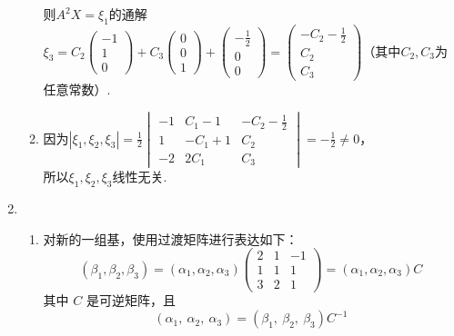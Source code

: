 \begin{enumerate}
\begin{enumerate}
                则$A^2X=\xi_1$的通解\\
                $\xi_3=C_2\begin{pmatrix}
                    -1 \\
                    1 \\
                    0
                \end{pmatrix}+C_3\begin{pmatrix}
                    0 \\
                    0 \\
                    1
                \end{pmatrix}+\begin{pmatrix}
                    -\frac 12 \\
                    0 \\
                    0
                \end{pmatrix}=\begin{pmatrix}
                    -C_2 - \frac 12 \\
                    C_2 \\
                    C_3
                \end{pmatrix}$（其中$C_2, C_3$为任意常数）.
            \item
                因为$|\xi_1,\xi_2,\xi_3|=\frac 12\begin{vmatrix}
                    -1 & C_1 - 1 & -C_2 - \frac 12 \\
                    1 & -C_1 + 1 & C_2 \\
                    -2 & 2C_1 & C_3
                \end{vmatrix}=-\frac 12\neq 0$，\\
                所以$\xi_1,\xi_2,\xi_3$线性无关.
        \end{enumerate}
    \item \begin{enumerate}
        \item 对新的一组基，使用过渡矩阵进行表达如下：
        \[(\beta_{1}, \beta_{2}, \beta_{3})=(\alpha_{1}, \alpha_{2}, \alpha_{3})\begin{pmatrix}
        2 & 1 & -1 \\
        1 & 1 & 1 \\
        3 & 2 & 1    
        \end{pmatrix}=(\alpha_{1}, \alpha_{2}, \alpha_{3}) C\]
        其中 $C$ 是可逆矩阵，且
        \[(\alpha_{1},\ \alpha_{2},\ \alpha_{3})=(\beta_{1},\ \beta_{2},\ \beta_{3}) C^{-1}\]

\end{enumerate}
\end{enumerate}
